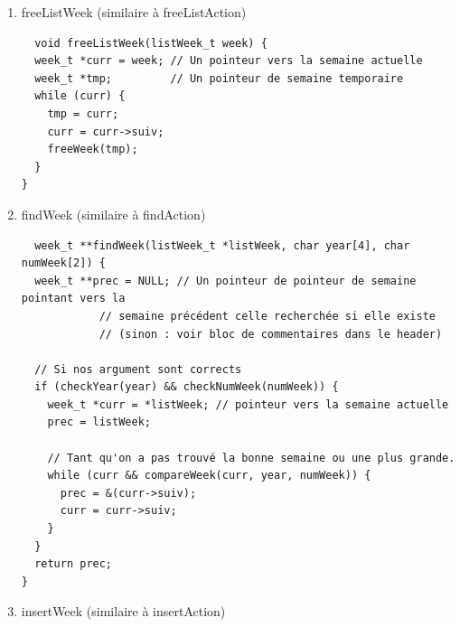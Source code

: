 \documentclass[11pt]{article}
\begin{document}
\begin{enumerate}
\begin{lstlisting}
\end{lstlisting}


\item freeListWeek (similaire à freeListAction)
\label{sec:orgf730853}

\begin{lstlisting}
  void freeListWeek(listWeek_t week) {
  week_t *curr = week; // Un pointeur vers la semaine actuelle
  week_t *tmp;         // Un pointeur de semaine temporaire
  while (curr) {
    tmp = curr;
    curr = curr->suiv;
    freeWeek(tmp);
  }
}
\end{lstlisting}


\item findWeek (similaire à findAction)
\label{sec:org9ae4623}

\begin{lstlisting}
  week_t **findWeek(listWeek_t *listWeek, char year[4], char numWeek[2]) {
  week_t **prec = NULL; // Un pointeur de pointeur de semaine pointant vers la
			// semaine précédent celle recherchée si elle existe
			// (sinon : voir bloc de commentaires dans le header)

  // Si nos argument sont corrects
  if (checkYear(year) && checkNumWeek(numWeek)) {
    week_t *curr = *listWeek; // pointeur vers la semaine actuelle
    prec = listWeek;

    // Tant qu'on a pas trouvé la bonne semaine ou une plus grande.
    while (curr && compareWeek(curr, year, numWeek)) {
      prec = &(curr->suiv);
      curr = curr->suiv;
    }
  }
  return prec;
}
\end{lstlisting}


\item insertWeek (similaire à insertAction)
\label{sec:orgf8a8860}


\end{enumerate}
\end{document}
